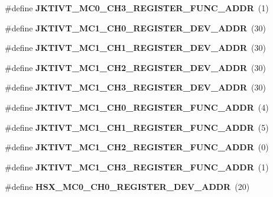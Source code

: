 \begin{DoxyCompactItemize}
\item 
\#define {\bfseries J\+K\+T\+I\+V\+T\+\_\+\+M\+C0\+\_\+\+C\+H3\+\_\+\+R\+E\+G\+I\+S\+T\+E\+R\+\_\+\+F\+U\+N\+C\+\_\+\+A\+D\+DR}~(1)\label{types_8h_a1ef7141e216b11f2631a8ac995a34236}

\item 
\#define {\bfseries J\+K\+T\+I\+V\+T\+\_\+\+M\+C1\+\_\+\+C\+H0\+\_\+\+R\+E\+G\+I\+S\+T\+E\+R\+\_\+\+D\+E\+V\+\_\+\+A\+D\+DR}~(30)\label{types_8h_af559def4c09229197e66cf5960f1aa02}

\item 
\#define {\bfseries J\+K\+T\+I\+V\+T\+\_\+\+M\+C1\+\_\+\+C\+H1\+\_\+\+R\+E\+G\+I\+S\+T\+E\+R\+\_\+\+D\+E\+V\+\_\+\+A\+D\+DR}~(30)\label{types_8h_a4fc17fd8b24d3435e67d64038f4362a3}

\item 
\#define {\bfseries J\+K\+T\+I\+V\+T\+\_\+\+M\+C1\+\_\+\+C\+H2\+\_\+\+R\+E\+G\+I\+S\+T\+E\+R\+\_\+\+D\+E\+V\+\_\+\+A\+D\+DR}~(30)\label{types_8h_a6abd14f082080e93b497faea32db10a4}

\item 
\#define {\bfseries J\+K\+T\+I\+V\+T\+\_\+\+M\+C1\+\_\+\+C\+H3\+\_\+\+R\+E\+G\+I\+S\+T\+E\+R\+\_\+\+D\+E\+V\+\_\+\+A\+D\+DR}~(30)\label{types_8h_a5e3e78fbf78ab646158d0cbfcd56c876}

\item 
\#define {\bfseries J\+K\+T\+I\+V\+T\+\_\+\+M\+C1\+\_\+\+C\+H0\+\_\+\+R\+E\+G\+I\+S\+T\+E\+R\+\_\+\+F\+U\+N\+C\+\_\+\+A\+D\+DR}~(4)\label{types_8h_aa713c04c5c8e574b43e0d6d6fa96be7e}

\item 
\#define {\bfseries J\+K\+T\+I\+V\+T\+\_\+\+M\+C1\+\_\+\+C\+H1\+\_\+\+R\+E\+G\+I\+S\+T\+E\+R\+\_\+\+F\+U\+N\+C\+\_\+\+A\+D\+DR}~(5)\label{types_8h_a59d01471d69423a214dc8db3519af3de}

\item 
\#define {\bfseries J\+K\+T\+I\+V\+T\+\_\+\+M\+C1\+\_\+\+C\+H2\+\_\+\+R\+E\+G\+I\+S\+T\+E\+R\+\_\+\+F\+U\+N\+C\+\_\+\+A\+D\+DR}~(0)\label{types_8h_ab8abdd8a242a3a1314fb5b30d2b9b613}

\item 
\#define {\bfseries J\+K\+T\+I\+V\+T\+\_\+\+M\+C1\+\_\+\+C\+H3\+\_\+\+R\+E\+G\+I\+S\+T\+E\+R\+\_\+\+F\+U\+N\+C\+\_\+\+A\+D\+DR}~(1)\label{types_8h_a42da512eaa955bd9aea434ad49a363d6}

\item 
\#define {\bfseries H\+S\+X\+\_\+\+M\+C0\+\_\+\+C\+H0\+\_\+\+R\+E\+G\+I\+S\+T\+E\+R\+\_\+\+D\+E\+V\+\_\+\+A\+D\+DR}~(20)\label{types_8h_a9b7316bd4085ecb228a3162e44418302}


\end{DoxyCompactItemize}
